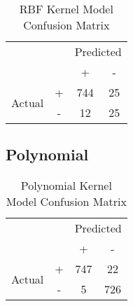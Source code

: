 \begin{table}[h!]
    \centering
    \begin{tabular}[h]{c c|c|c|}
        \cline{3-4}
        & & \multicolumn{2}{c|}{Predicted} \\
        \cline{3-4}
        & & + & - \\
        \hline
        \multicolumn{1}{|c|}{\multirow{2}{3em}{Actual}} & + & 744 & 25 \\
        \cline{2-4}
        \multicolumn{1}{|c|}{} & - & 12 & 25 \\
        \hline
    \end{tabular}
    \caption{\label{tab:rbf_confusion}RBF Kernel Model Confusion Matrix}
\end{table}

\subsection{Polynomial}





\begin{table}[h!]
    \centering
    \begin{tabular}[h]{c c|c|c|}
        \cline{3-4}
        & & \multicolumn{2}{c|}{Predicted} \\
        \cline{3-4}
        & & + & - \\
        \hline
        \multicolumn{1}{|c|}{\multirow{2}{3em}{Actual}} & + & 747 & 22 \\
        \cline{2-4}
        \multicolumn{1}{|c|}{} & - & 5 & 726 \\
        \hline
    \end{tabular}
    \caption{\label{tab:poly_confusion}Polynomial Kernel Model Confusion Matrix}
\end{table}

